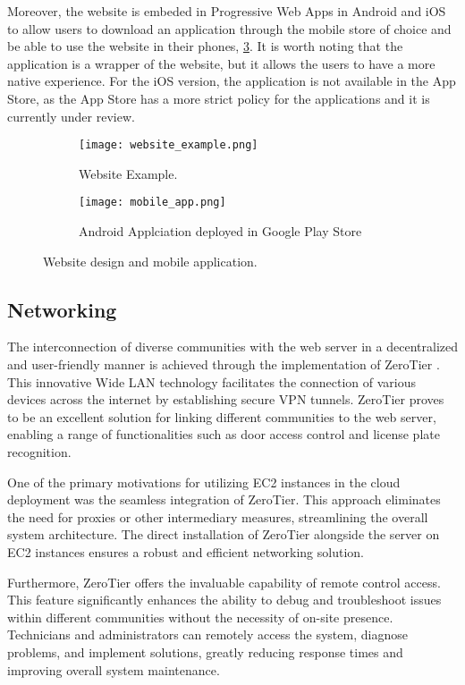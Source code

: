 Moreover, the website is embeded in Progressive Web Apps in Android and iOS to allow users to download an application through the mobile store of choice and be able to use the website in their phones, \cref{fig:mobile_app}. It is worth noting that the application is a wrapper of the website, but it allows the users to have a more native experience. For the iOS version, the application is not available in the App Store, as the App Store has a more strict policy for the applications and it is currently under review.

\begin{figure}
	\hfill
	\begin{subfigure}{0.45\textwidth}
		\texttt{[image: website\_example.png]}
		\caption{Website Example.}\label{fig:website_example}
	\end{subfigure}
	\hfill
	\begin{subfigure}{0.45\textwidth}
		\texttt{[image: mobile\_app.png]}
		\caption{Android Applciation deployed in Google Play Store}\label{fig:mobile_app}
	\end{subfigure}
	\hfill

	\caption{Website design and mobile application.}
\end{figure}

\subsection{Networking}\label{sec:networking}

The interconnection of diverse communities with the web server in a decentralized and user-friendly manner is achieved through the implementation of ZeroTier \autocite{zerotier2025}. This innovative Wide LAN technology facilitates the connection of various devices across the internet by establishing secure VPN tunnels. ZeroTier proves to be an excellent solution for linking different communities to the web server, enabling a range of functionalities such as door access control and license plate recognition.

One of the primary motivations for utilizing EC2 instances in the cloud deployment was the seamless integration of ZeroTier. This approach eliminates the need for proxies or other intermediary measures, streamlining the overall system architecture. The direct installation of ZeroTier alongside the server on EC2 instances ensures a robust and efficient networking solution.

Furthermore, ZeroTier offers the invaluable capability of remote control access. This feature significantly enhances the ability to debug and troubleshoot issues within different communities without the necessity of on-site presence. Technicians and administrators can remotely access the system, diagnose problems, and implement solutions, greatly reducing response times and improving overall system maintenance.

